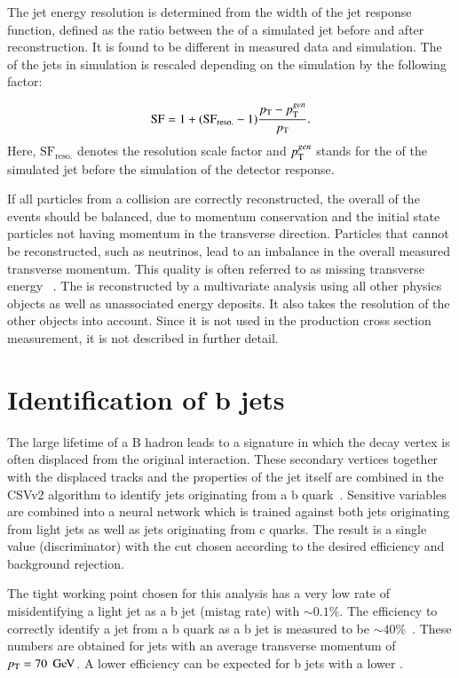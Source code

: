 The jet energy resolution is determined from the width of the jet response function, defined as the ratio between the \pt of a simulated jet before and after reconstruction. It is found to be different in measured data and simulation. The \pt of the jets in simulation is rescaled depending on the simulation by the following
factor:

\begin{equation}
\mathrm{SF} = 1 + (\mathrm{SF}_{\mathrm{reso.}}-1) \frac{p_{\mathrm{T}} - p_{\mathrm{T}}^{gen}}{p_{\mathrm{T}}}.
\end{equation}
Here, $\mathrm{SF}_{\mathrm{reso.}}$ denotes the resolution scale factor and $p_{\mathrm{T}}^{gen}$ stands for the \pt of the simulated jet before the simulation of the detector response. 

If all particles from a collision are correctly reconstructed, the overall \pt of the events should be balanced, due to momentum conservation and the initial state particles not having momentum in the transverse direction.
Particles that cannot be reconstructed, such as neutrinos, lead to an imbalance in the overall measured transverse momentum. This quality is often referred to as missing transverse energy \ETmiss~\cite{CMS-PAS-JME-16-004}.
The \ETmiss is reconstructed by a multivariate analysis using all other physics objects as well as unassociated energy deposits. It also takes the resolution of the other objects into account.
Since it is not used in the \ttbar production cross section measurement, it is not described in further detail.

\section{Identification of b jets}
\label{sec:SimReco_BjetReco}


The large lifetime of a B hadron leads to a signature in which the decay vertex is often displaced from the original interaction.
These secondary vertices together with the displaced tracks and the properties of the jet itself are combined in the CSVv2 algorithm to identify jets originating from a b quark~\cite{BTV16002}.
Sensitive variables are combined into a neural network which is trained against both jets originating from light jets as well as jets originating from c quarks.
The result is a single value (discriminator) with the cut chosen according to the desired efficiency and background rejection.

The tight working point chosen for this analysis has a very low rate of misidentifying a light jet as a b jet (mistag rate) with $\sim0.1\%$. The efficiency to correctly identify a jet from a b quark
as a b jet is measured to be $\sim40\%$~\cite{BTV16002}. These numbers are obtained for jets with an average transverse momentum of $p_{\mathrm{T}} = 70\;\,\text{Ge\hspace{-.08em}V}$. A lower efficiency can be expected for b jets with a lower \pt.

